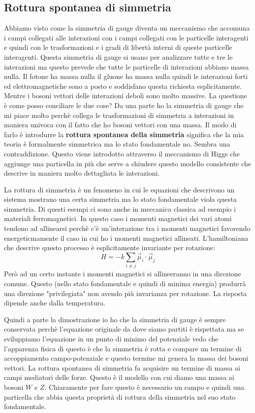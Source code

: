 \subsection{Rottura spontanea di simmetria}
Abbiamo visto come la simmetria di gauge diventa un meccanismo che accomuna i campi collegati alle interazioni con i campi collegati con le particelle interagenti e quindi con le trasformazioni e i gradi di libertà interni di queste particelle interagenti. Questa simmetria di gauge si usano per analizzare tutte e tre le interazioni ma questo prevede che tutte le particelle di interazioni abbiano massa nulla. Il fotone ha massa nulla il gluone ha massa nulla quindi le interazioni forti ed elettromagnetiche sono a posto e soddisfano questa richiesta esplicitamente. Mentre i bosoni vettori delle interazioni deboli sono molto massive. La questione è come posso conciliare le due cose? Da una parte ho la simmetria di gauge che mi piace molto perchè collega le trasformazioni di simmetria a interazioni in maniera univoca con il fatto che ho bosoni vettori con una massa. Il modo di farlo è introdurre la \textbf{rottura spontanea della simmetria} significa che la mia teoria è formalmente simmetrica ma lo stato fondamentale no. Sembra una contraddizione. Questo viene introdotto attraverso il meccanismo di Higgs che aggiunge una particella in più che serve a chiudere questo modello consistente che descrive in maniera molto dettagliata le interazioni. 

La rottura di simmetria è un fenomeno in cui le equazioni che descrivono un sistema mostrano una certa simmetria ma lo stato fondamentale viola questa simmetria. Di questi esempi ci sono anche in meccanica classica ad esempio i materiali ferromagnetici. In questo caso i momenti magnetici dei vari atomi tendono ad allinearsi perchè c'è un'interazione tra i momenti magnetici favorendo energeticmamente il caso in cui ho i momenti magnetici allineati. L'hamiltoniana che descrive questo processo è esplicitamente invariante per rotazione:
\begin{equation*}
    H=-k\sum_{i\ne j}\Vec{\mu}_i\cdot\Vec{\mu}_j
\end{equation*}
Però ad un certo instante i momenti magnetici si allineeranno in una direzione comune. Questo (nello stato fondamentale e quindi di minima energia) produrrà una direzione "privilegiata" non avendo più invarianza per rotazione. La risposta dipende anche dalla temperatura.

Quindi a parte la dimostrazione io ho che la simmetria di gauge è sempre conservata perchè l'equazione originale da dove siamo partiti è rispettata ma se sviluppiamo l'equazione in un punto di minimo del potenziale vedo che l'apparenza fisica di questo è che la simmetria è rotta e compare un termine di accoppiamento campo-potenziale e questo termine mi genera la massa dei bosoni vettori. La rottura spontanea di simmetria fa acquisire un termine di massa ai campi mediatori delle forze. Questo è il modello con cui diamo una massa ai bosoni $W$ e $Z$. Chiaramente per fare questo è necessario un campo e quindi una particella che abbia questa proprietà di rottura della simmetria nel suo stato fondamentale.
